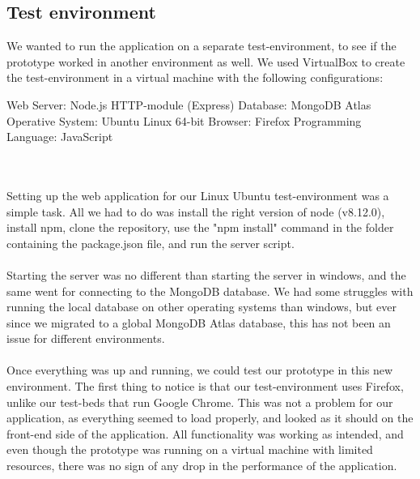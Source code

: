 \subsection{Test environment}
We wanted to run the application on a separate test-environment, to see if the prototype worked in another environment as well. We used VirtualBox to create the test-environment in a virtual machine with the following configurations:
\begin{listing}
Web Server: Node.js HTTP-module (Express) \newline
Database: MongoDB Atlas \newline
Operative System: Ubuntu Linux 64-bit \newline
Browser: Firefox \newline
Programming Language: JavaScript
\end{listing}
\\\\
Setting up the web application for our Linux Ubuntu test-environment was a simple task. All we had to do was install the right version of node (v8.12.0), install npm, clone the repository, use the "npm install" command in the folder containing the package.json file, and run the server script.
\\\\
Starting the server was no different than starting the server in windows, and the same went for connecting to the MongoDB database. We had some struggles with running the local database on other operating systems than windows, but ever since we migrated to a global MongoDB Atlas database, this has not been an issue for different environments. 
\\\\
Once everything was up and running, we could test our prototype in this new environment. The first thing to notice is that our test-environment uses Firefox, unlike our test-beds that run Google Chrome. This was not a problem for our application, as everything seemed to load properly, and looked as it should on the front-end side of the application. All functionality was working as intended, and even though the prototype was running on a virtual machine with limited resources, there was no sign of any drop in the performance of the application.


